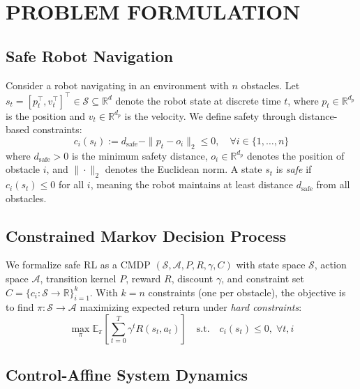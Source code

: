 \documentclass[letterpaper, 10 pt, conference]{ieeeconf}
\begin{document}
\section{PROBLEM FORMULATION}
\label{sec:problem}

\subsection{Safe Robot Navigation}

Consider a robot navigating in an environment with $n$ obstacles. Let $s_t = [p_t^\top, v_t^\top]^\top \in \mathcal{S} \subseteq \mathbb{R}^d$ denote the robot state at discrete time $t$, where $p_t \in \mathbb{R}^{d_p}$ is the position and $v_t \in \mathbb{R}^{d_p}$ is the velocity. We define safety through distance-based constraints:
\begin{equation}
    c_i(s_t) := d_{\text{safe}} - \|p_t - o_i\|_2 \leq 0, \quad \forall i \in \{1, \ldots, n\}
    \label{eq:constraint}
\end{equation}
where $d_{\text{safe}} > 0$ is the minimum safety distance, $o_i \in \mathbb{R}^{d_p}$ denotes the position of obstacle $i$, and $\|\cdot\|_2$ denotes the Euclidean norm. A state $s_t$ is \emph{safe} if $c_i(s_t) \leq 0$ for all $i$, meaning the robot maintains at least distance $d_{\text{safe}}$ from all obstacles.

\subsection{Constrained Markov Decision Process}

We formalize safe RL as a CMDP $(\mathcal{S}, \mathcal{A}, P, R, \gamma, C)$ with state space $\mathcal{S}$, action space $\mathcal{A}$, transition kernel $P$, reward $R$, discount $\gamma$, and constraint set $C = \{c_i: \mathcal{S} \rightarrow \mathbb{R}\}_{i=1}^k$. With $k = n$ constraints (one per obstacle), the objective is to find $\pi: \mathcal{S} \rightarrow \mathcal{A}$ maximizing expected return under \emph{hard constraints}:
\begin{equation}
    \max_{\pi} \mathbb{E}_{\pi}\left[ \sum_{t=0}^{T} \gamma^t R(s_t, a_t) \right] \quad \text{s.t.} \quad c_i(s_t) \leq 0, \; \forall t, i
    \label{eq:cmdp}
\end{equation}

\subsection{Control-Affine System Dynamics}
\end{document}
